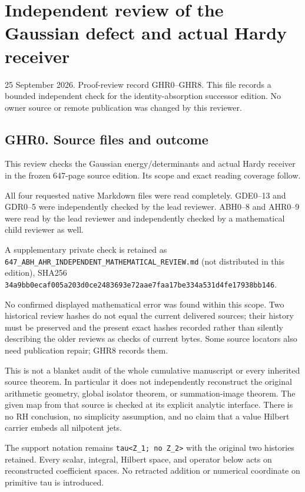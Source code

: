 \documentclass[
]{article}
\author{}
\date{}
\begin{document}
\section{Independent review of the Gaussian defect and actual Hardy receiver}\label{independent-review-of-the-gaussian-defect-and-actual-hardy-receiver}

25 September 2026. Proof-review record GHR0--GHR8. This file records a bounded independent check for the identity-absorption successor edition. No owner source or remote publication was changed by this reviewer.

\subsection{GHR0. Source files and outcome}\label{ghr0.-source-files-and-outcome}

This review checks the Gaussian energy/determinants and actual Hardy receiver in the frozen 647-page source edition. Its scope and exact reading coverage follow.

All four requested native Markdown files were read completely. GDE0--13 and GDR0--5 were independently checked by the lead reviewer. ABH0--8 and AHR0--9 were read by the lead reviewer and independently checked by a mathematical child reviewer as well.

A supplementary private check is retained as \texttt{647\_ABH\_AHR\_INDEPENDENT\_MATHEMATICAL\_REVIEW.md} (not distributed in this edition), SHA256 \texttt{34a9bb0ecaf005a203d0ce2483693e72aae7faa17be334a531d4fe17938bb146}.

No confirmed displayed mathematical error was found within this scope. Two historical review hashes do not equal the current delivered sources; their history must be preserved and the present exact hashes recorded rather than silently describing the older reviews as checks of current bytes. Some source locators also need publication repair; GHR8 records them.

This is not a blanket audit of the whole cumulative manuscript or every inherited source theorem. In particular it does not independently reconstruct the original arithmetic geometry, global isolator theorem, or summation-image theorem. The given map from that source is checked at its explicit analytic interface. There is no RH conclusion, no simplicity assumption, and no claim that a value Hilbert carrier embeds all nilpotent jets.

The support notation remains \texttt{tau\textless{}Z\_1;\ no\ Z\_2\textgreater{}} with the original two histories retained. Every scalar, integral, Hilbert space, and operator below acts on reconstructed coefficient spaces. No retracted addition or numerical coordinate on primitive tau is introduced.
\end{document}
